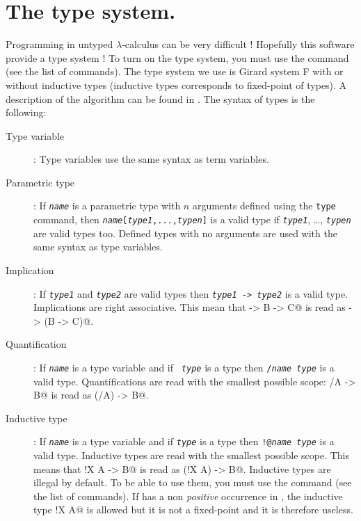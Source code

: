 {{\begin{description}
\begin{description}
\end{description}

\end{description}

\section{The type system.}

Programming in untyped $\lambda$-calculus can be very difficult ! Hopefully
this software provide a type system ! To turn on the type system, you must use
the \verb@typed@ command (see the list of commands). The type system we use is
Girard system F \cite{Kri90e,Gir86,GLT88} with or without inductive types
(inductive types corresponds to fixed-point of types). A description of the
algorithm can be found in \cite{Raf95}. The syntax of types is the following:
\begin{description}
\item[Type variable]: Type variables use the same syntax as term variables.
\item[Parametric type]: If {\tt\it name} is a parametric type with $n$
  arguments defined using
  the {\tt type} command, then {\tt{\it name}[{\it type1},...,{\it typen}]} is
    a valid type if {\tt\it type1}, \dots, {\tt\it typen} are valid types too.
  Defined types with no arguments are used with the same syntax as type
  variables.
\item[Implication]: If {\tt\it type1} and {\tt\it type2} are valid types then 
  {\tt{\it type1} -> {\it type2}} is a valid type. Implications are right
  associative. This mean that \verb@A -> B -> C@ is read as 
  \verb@A -> (B -> C)@.
\item[Quantification]: If {\tt\it name} is a type variable and if {\tt\it
    type} is a type then {\tt\verb@/\@{\it name} {\it type}} is a valid type.
  Quantifications are read with the smallest possible scope: \verb@/\X A -> B@
  is read as \verb@(/\X A) -> B@.
\item[Inductive type]: If {\tt\it name} is a type variable and if {\tt\it type}
  is a type then {\tt\verb@!@{\it name} {\it type}} is a valid type.
  Inductive types are read with the smallest possible scope. This means that
  \verb@!X A -> B@ is read as \verb@(!X A) -> B@. Inductive types are illegal
  by default. To be able to use them, you must use the \verb@inductive@
  command (see the list of commands). If \verb@X@ has a non {\em positive}
  occurrence in \verb@A@, the inductive type \verb@!X A@ is allowed but it is
  not a fixed-point and it is therefore useless.
\end{description}

}}
